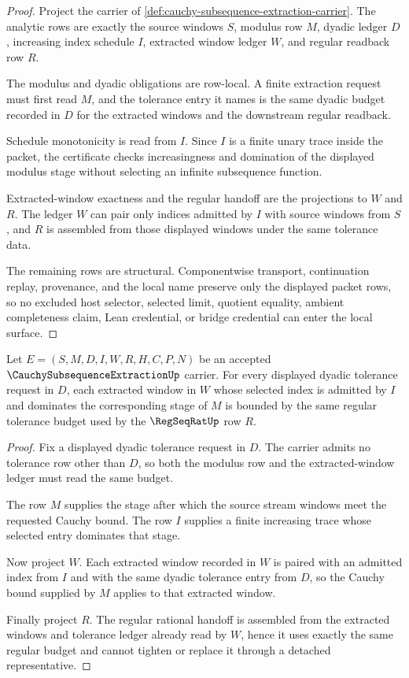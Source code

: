\begin{proof}
Project the carrier of \autoref{def:cauchy-subsequence-extraction-carrier}. The analytic rows are exactly the source windows $S$, modulus row $M$, dyadic ledger $D$, increasing index schedule $I$, extracted window ledger $W$, and regular readback row $R$.

The modulus and dyadic obligations are row-local. A finite extraction request must first read $M$, and the tolerance entry it names is the same dyadic budget recorded in $D$ for the extracted windows and the downstream regular readback.

Schedule monotonicity is read from $I$. Since $I$ is a finite unary trace inside the packet, the certificate checks increasingness and domination of the displayed modulus stage without selecting an infinite subsequence function.

Extracted-window exactness and the regular handoff are the projections to $W$ and $R$. The ledger $W$ can pair only indices admitted by $I$ with source windows from $S$, and $R$ is assembled from those displayed windows under the same tolerance data.

The remaining rows are structural. Componentwise transport, continuation replay, provenance, and the local name preserve only the displayed packet rows, so no excluded host selector, selected limit, quotient equality, ambient completeness claim, Lean credential, or bridge credential can enter the local surface.
\end{proof}

\begin{theorem}
\label{thm:cauchy-subsequence-extraction-regular-window}
Let $E=(S,M,D,I,W,R,H,C,P,N)$ be an accepted $\CauchySubsequenceExtractionUp$ carrier. For every displayed dyadic tolerance request in $D$, each extracted window in $W$ whose selected index is admitted by $I$ and dominates the corresponding stage of $M$ is bounded by the same regular tolerance budget used by the $\RegSeqRatUp$ row $R$.
\end{theorem}
\begin{proof}
Fix a displayed dyadic tolerance request in $D$. The carrier admits no tolerance row other than $D$, so both the modulus row and the extracted-window ledger must read the same budget.

The row $M$ supplies the stage after which the source stream windows meet the requested Cauchy bound. The row $I$ supplies a finite increasing trace whose selected entry dominates that stage.

Now project $W$. Each extracted window recorded in $W$ is paired with an admitted index from $I$ and with the same dyadic tolerance entry from $D$, so the Cauchy bound supplied by $M$ applies to that extracted window.

Finally project $R$. The regular rational handoff is assembled from the extracted windows and tolerance ledger already read by $W$, hence it uses exactly the same regular budget and cannot tighten or replace it through a detached representative.
\end{proof}

